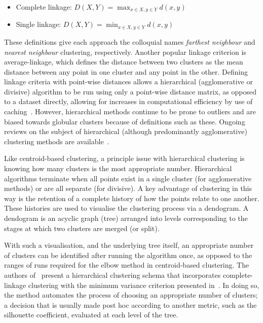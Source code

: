 \begin{itemize}
    \item Complete linkage: \(D(X, Y) = \max_{x \in X, y \in Y} d(x, y)\)
    \item Single linkage: \(D(X, Y) = \min_{x \in X, y \in Y} d(x, y)\)
\end{itemize}

These definitions give each approach the colloquial names \emph{farthest
neighbour} and \emph{nearest neighbour} clustering, respectively. Another
popular linkage criterion is average-linkage, which defines the distance between
two clusters as the mean distance between any point in one cluster and any point
in the other. Defining linkage criteria with point-wise distances allows a
hierarchical (agglomerative or divisive) algorithm to be run using only a
point-wise distance matrix, as opposed to a dataset directly, allowing for
increases in computational efficiency by use of caching~\cite{Nielsen2016}.
However, hierarchical methods continue to be prone to outliers and are biased
towards globular clusters because of definitions such as these. Ongoing reviews
on the subject of hierarchical (although predominantly agglomerative) clustering
methods are available~\cite{Murtagh1983,Murtagh2012,Murtagh2017}.

Like centroid-based clustering, a principle issue with hierarchical clustering
is knowing how many clusters is the most appropriate number. Hierarchical
algorithms terminate when all points exist in a single cluster (for
agglomerative methods) or are all separate (for divisive). A key advantage of
clustering in this way is the retention of a complete history of how the points
relate to one another. These histories are used to visualise the clustering
process via a dendogram. A dendogram is an acyclic graph (tree) arranged into
levels corresponding to the stages at which two clusters are merged (or split).

With such a visualisation, and the underlying tree itself, an appropriate number
of clusters can be identified after running the algorithm once, as opposed to
the ranges of runs required for the elbow method in centroid-based clustering.
The authors of~\cite{Tellaroli2016} present a hierarchical clustering schema
that incorporates complete-linkage clustering with the minimum variance
criterion presented in~\cite{Ward1963}. In doing so, the method automates the
process of choosing an appropriate number of clusters; a decision that is
usually made post hoc according to another metric, such as the silhouette
coefficient, evaluated at each level of the tree.

